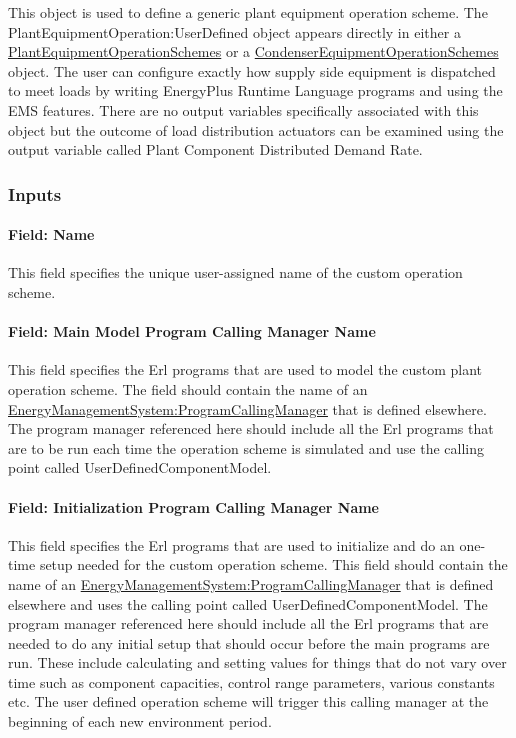 This object is used to define a generic plant equipment operation scheme. The PlantEquipmentOperation:UserDefined object appears directly in either a \hyperref[plantequipmentoperationschemes]{PlantEquipmentOperationSchemes} or a \hyperref[condenserequipmentoperationschemes]{CondenserEquipmentOperationSchemes} object. The user can configure exactly how supply side equipment is dispatched to meet loads by writing EnergyPlus Runtime Language programs and using the EMS features. There are no output variables specifically associated with this object but the outcome of load distribution actuators can be examined using the output variable called Plant Component Distributed Demand Rate.

\subsubsection{Inputs}\label{inputs-1-047}

\paragraph{Field: Name}\label{field-name-4-032}

This field specifies the unique user-assigned name of the custom operation scheme.

\paragraph{Field: Main Model Program Calling Manager Name}\label{field-main-model-program-calling-manager-name-1}

This field specifies the Erl programs that are used to model the custom plant operation scheme. The field should contain the name of an \hyperref[energymanagementsystemprogramcallingmanager]{EnergyManagementSystem:ProgramCallingManager} that is defined elsewhere. The program manager referenced here should include all the Erl programs that are to be run each time the operation scheme is simulated and use the calling point called UserDefinedComponentModel.

\paragraph{Field: Initialization Program Calling Manager Name}\label{field-initialization-program-calling-manager-name}

This field specifies the Erl programs that are used to initialize and do an one-time setup needed for the custom operation scheme. This field should contain the name of an \hyperref[energymanagementsystemprogramcallingmanager]{EnergyManagementSystem:ProgramCallingManager} that is defined elsewhere and uses the calling point called UserDefinedComponentModel. The program manager referenced here should include all the Erl programs that are needed to do any initial setup that should occur before the main programs are run. These include calculating and setting values for things that do not vary over time such as component capacities, control range parameters, various constants etc. The user defined operation scheme will trigger this calling manager at the beginning of each new environment period.

